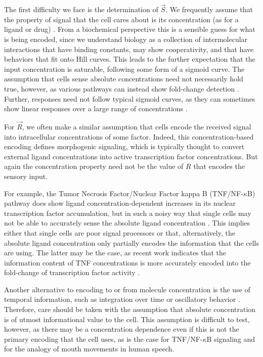The first difficulty we face is the determination of $\vec{S}$. 
We frequently assume that the property
of signal that the cell cares about is its
concentration (as for a ligand or drug) \cite{Becker2010,Cheong2011}.
From a biochemical perspective this is a sensible guess for what
is being encoded, since we understand biology as a collection of
intermolecular interactions that have binding constants, may show
cooperativity, and that have behaviors that fit onto Hill curves.
This leads to the further expectation that the
input concentration is saturable, following some form of a sigmoid
curve. The assumption that cells sense absolute concentrations need not
necessarily hold true, however, as various pathways can instead show fold-change
detection \cite{Goentoro2009,Shoval2010,Lee2014}. Further, responses need
not follow typical sigmoid curves, as they can sometimes show linear responses 
over a large range of concentrations \cite{Becker2010}.


For $\vec{R}$, we often make a similar assumption that cells encode the
received signal into intracellular concentrations of some factor.
Indeed, this concentration-based encoding defines
morphogenic signaling, which
is typically thought to convert external ligand concentrations into active transcription
factor concentrations. But again the concentration property need not be
the value of $R$ that encodes the sensory input.


For example, the Tumor Necrosis Factor/Nuclear Factor
kappa B (TNF/NF-$\kappa$B) pathway
does show ligand concentration-dependent increases in its nuclear transcription
factor accumulation, but in such a noisy way that single cells may not be able
to accurately sense the absolute ligand concentration \cite{Cheong2011}.
This implies either that single cells are
poor signal processors or that, alternatively, the absolute ligand concentration only
partially encodes the information that the cells are using.
The latter may be the case,
as recent work indicates that the information content of TNF
concentrations is more accurately encoded into the fold-change of transcription
factor activity \cite{Lee2014}.


Another alternative to encoding to or from molecule concentration is the use of
temporal information, such as integration over time or oscillatory behavior
\cite{Tay2010,Kang2011}. Therefore, care should be taken with the assumption
that absolute concentration is of utmost informational value to the cell. This assumption
is difficult to test, however, as there may be a concentration dependence
even if this is not the primary encoding that the cell uses,
as is the case for TNF/NF-$\kappa$B signaling and for the analogy
of mouth movements in human speech.



